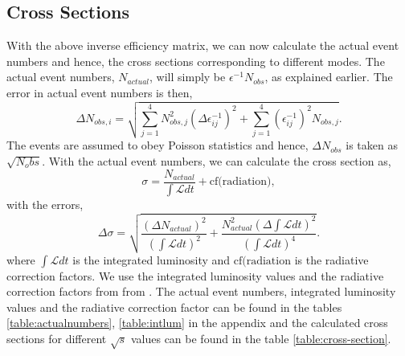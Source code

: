 \subsection{Cross Sections}
With the above inverse efficiency matrix, we can now calculate the actual event numbers and hence, the cross sections corresponding to different modes. The actual event numbers, $N_{actual}$, will simply be $\epsilon^{-1} N_{obs}$, as explained earlier. The error in actual event numbers is then,
\begin{equation}
    \Delta N_{obs, i} = \sqrt{\sum_{j=1}^4 N_{obs, j}^2 (\Delta \epsilon_{ij}^{-1})^2 + 
    \sum_{j=1}^4 (\epsilon_{ij}^{-1})^{2} N_{obs, j}}.
\end{equation}
The events are assumed to obey Poisson statistics and hence, $\Delta N_{obs}$ is taken as $\sqrt{N_obs}$. With the actual event numbers, we can calculate the cross section as,
\begin{equation}
    \sigma = \frac{N_{actual}}{\int \mathcal{L} dt} + \text{cf(radiation)},
\end{equation}
with the errors,
\begin{equation}
    \Delta \sigma = \sqrt{\frac{(\Delta N_{actual})^2}{(\int \mathcal{L} dt)^2} + 
    \frac{N_{actual}^2 (\Delta \int \mathcal{L} dt)^2}{(\int \mathcal{L} dt)^4}}.
\end{equation}
where $\int \mathcal{L} dt$ is the integrated luminosity and $\text{cf(radiation}$ is the radiative correction factors. We use the integrated luminosity values and the radiative correction factors from from \cite{UB}. The actual event numbers, integrated luminosity values and the radiative correction factor can be found in the tables \ref{table:actualnumbers}, \ref{table:intlum} in the appendix and the calculated cross sections for different $\sqrt{s}$ values can be found in the table \ref{table:cross-section}.
